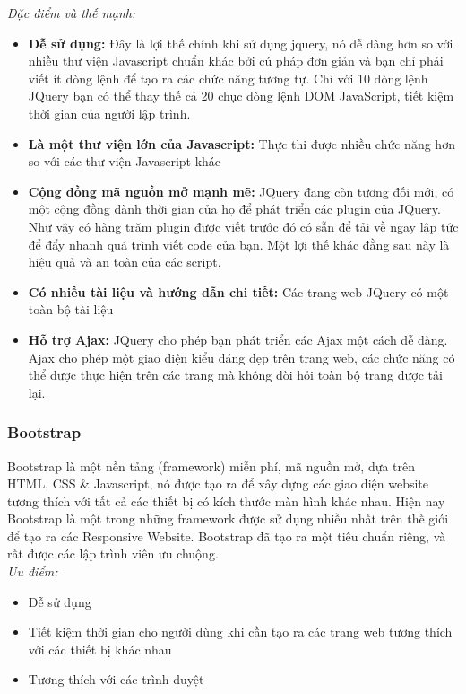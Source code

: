 \textit{Đặc điểm và thế mạnh:}
\begin{itemize}
    \item \textbf{Dễ sử dụng:} Đây là lợi thế chính khi sử dụng jquery, nó dễ dàng hơn so với nhiều thư viện Javascript chuẩn khác bởi cú pháp đơn giản và bạn chỉ phải viết ít dòng lệnh để tạo ra các chức năng tương tự. Chỉ với 10 dòng lệnh JQuery bạn có thể thay thế cả 20 chục dòng lệnh DOM JavaScript, tiết kiệm thời gian của người lập trình.
    \item \textbf{Là một thư viện lớn của Javascript:} Thực thi được nhiều chức năng hơn so với các thư viện Javascript khác
    \item \textbf{Cộng đồng mã nguồn mở mạnh mẽ:} JQuery đang còn tương đối mới, có một cộng đồng dành thời gian của họ để phát triển các plugin của JQuery. Như vậy có hàng trăm plugin được viết trước đó có sẵn để tải về ngay lập tức để đẩy nhanh quá trình viết code của bạn. Một lợi thế khác đằng sau này là hiệu quả và an toàn của các script.
    \item \textbf{Có nhiều tài liệu và hướng dẫn chi tiết:} Các trang web JQuery có một toàn bộ tài liệu
    \item \textbf{Hỗ trợ Ajax:} JQuery cho phép bạn phát triển các Ajax một cách dễ dàng. Ajax cho phép một giao diện kiểu dáng đẹp trên trang web, các chức năng có thể được thực hiện trên các trang mà không đòi hỏi toàn bộ trang được tải lại.
\end{itemize}
\subsubsection{Bootstrap}
Bootstrap là một nền tảng (framework) miễn phí, mã nguồn mở, dựa trên HTML, CSS & Javascript, nó được tạo ra để xây dựng các giao diện website tương thích với tất cả các thiết bị có kích thước màn hình khác nhau.
Hiện nay Bootstrap là một trong những framework được sử dụng nhiều nhất trên thế giới để tạo ra các Responsive Website. Bootstrap đã tạo ra một tiêu chuẩn riêng, và rất được các lập trình viên ưu chuộng.\\

\textit{Ưu điểm:}
\begin{itemize}
    \item Dễ sử dụng
    \item Tiết kiệm thời gian cho người dùng khi cần tạo ra các trang web tương thích với các thiết bị khác nhau
    \item Tương thích với các trình duyệt
\end{itemize}
